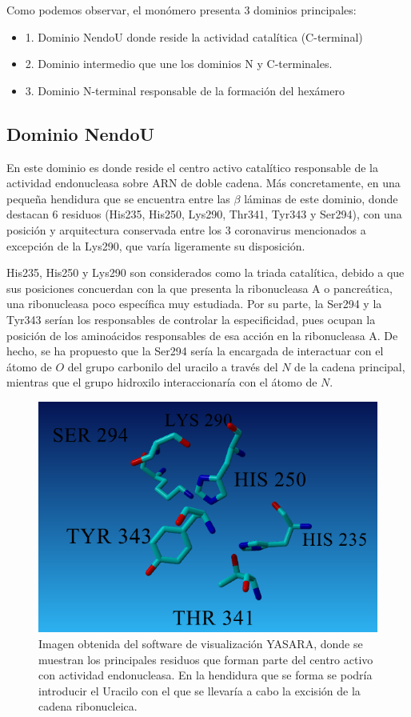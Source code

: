\documentclass[12pt]{article}
\begin{document}
Como podemos observar, el monómero presenta 3 dominios principales:
\begin{itemize}
\item 1. Dominio NendoU donde reside la actividad catalítica (C-terminal)
\item 2. Dominio intermedio que une los dominios N y C-terminales.
\item 3. Dominio N-terminal responsable de la formación del hexámero
\end{itemize}

\subsection{Dominio NendoU}
En este dominio es donde reside el centro activo catalítico responsable de la actividad endonucleasa sobre ARN de doble cadena. Más concretamente, en una pequeña hendidura que se encuentra entre las $\beta$ láminas de este dominio, donde destacan 6 residuos (His235, His250, Lys290, Thr341, Tyr343 y Ser294), con una posición y arquitectura conservada entre los 3 coronavirus mencionados a excepción de la Lys290, que varía ligeramente su disposición. \cite{Pillon2021}
\newline

His235, His250 y Lys290 son considerados como la triada catalítica, debido a que sus posiciones concuerdan con la que presenta la ribonucleasa A o pancreática, una ribonucleasa poco específica muy estudiada. Por su parte, la Ser294 y la Tyr343 serían los responsables de controlar la especificidad, pues ocupan la posición de los aminoácidos responsables de esa acción en la ribonucleasa A. De hecho, se ha propuesto que la Ser294 sería la encargada de interactuar con el átomo de $O$ del grupo carbonilo del uracilo a través del $N$ de la cadena principal, mientras que el grupo hidroxilo interaccionaría con el átomo de $N$.

\begin{figure}[H]
\centering
\includegraphics[width=1\textwidth]{Screenshot_12}
\caption{Imagen obtenida del software de visualización YASARA, donde se muestran los principales residuos que forman parte del centro activo con actividad endonucleasa. En la hendidura que se forma se podría introducir el Uracilo con el que se llevaría a cabo la excisión de la cadena ribonucleica.}
\end{figure}
\end{document}
